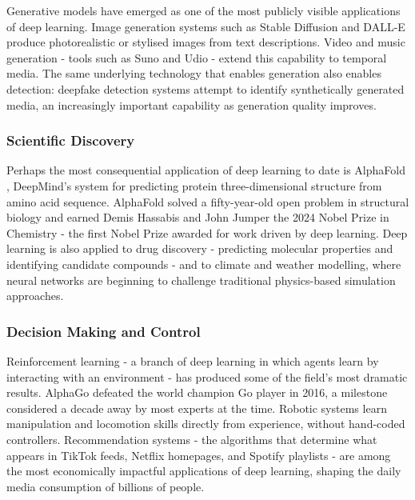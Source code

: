 Generative models have emerged as one of the most publicly visible applications of deep learning. Image generation systems such as Stable Diffusion and DALL-E produce photorealistic or stylised images from text descriptions. Video and music generation - tools such as Suno and Udio - extend this capability to temporal media. The same underlying technology that enables generation also enables detection: deepfake detection systems attempt to identify synthetically generated media, an increasingly important capability as generation quality improves.

\subsubsection{Scientific Discovery}

Perhaps the most consequential application of deep learning to date is AlphaFold \cite{jumper2021alphafold}, DeepMind's system for predicting protein three-dimensional structure from amino acid sequence. AlphaFold solved a fifty-year-old open problem in structural biology and earned Demis Hassabis and John Jumper the 2024 Nobel Prize in Chemistry - the first Nobel Prize awarded for work driven by deep learning.
Deep learning is also applied to drug discovery - predicting molecular properties and identifying candidate compounds - and to climate and weather modelling, where neural networks are beginning to challenge traditional physics-based simulation approaches.

\subsubsection{Decision Making and Control}

Reinforcement learning - a branch of deep learning in which agents learn by interacting with an environment - has produced some of the field's most dramatic results. AlphaGo \cite{silver2016alphago} defeated the world champion Go player in 2016, a milestone considered a decade away by most experts at the time. Robotic systems learn manipulation and locomotion skills directly from experience, without hand-coded controllers. Recommendation systems - the algorithms that determine what appears in TikTok feeds, Netflix homepages, and Spotify playlists - are among the most economically impactful applications of deep learning, shaping the daily media consumption of billions of people.



